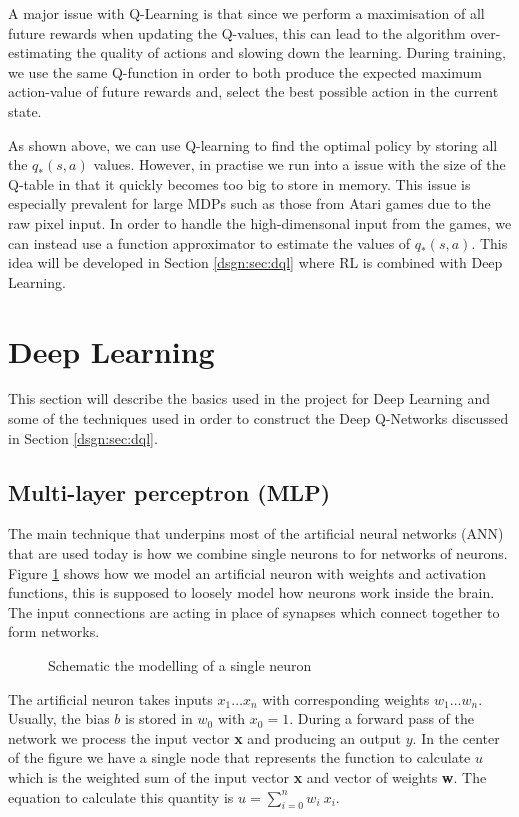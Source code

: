A major issue with Q-Learning is that since we perform a maximisation of all future rewards when updating the Q-values, this can lead to the algorithm over-estimating the quality of actions and slowing down the learning. During training, we use the same Q-function in order to both produce the expected maximum action-value of future rewards and, select the best possible action in the current state.



As shown above, we can use Q-learning to find the optimal policy by storing all the $q_*(s, a)$ values. However, in practise we run into a issue with the size of the Q-table in that it quickly becomes too big to store in memory. This issue is especially prevalent for large MDPs such as those from Atari games due to the raw pixel input. In order to handle the high-dimensonal input from the games, we can instead use a function approximator to estimate the values of $q_*(s, a)$. This idea will be developed in Section \ref{dsgn:sec:dql} where RL is combined with Deep Learning.

\section{Deep Learning}
\label{dsgn:sec:dl}
This section will describe the basics used in the project for Deep Learning and some of the techniques used in order to construct the Deep Q-Networks discussed in Section \ref{dsgn:sec:dql}.

\subsection{Multi-layer perceptron (MLP)}
\label{dsgn:sec:dl:mlp}
The main technique that underpins most of the artificial neural networks (ANN) that are used today is how we combine single neurons to for networks of neurons. Figure \ref{fig:neuron} shows how we model an artificial neuron with weights and activation functions, this is supposed to loosely model how neurons work inside the brain. The input connections are acting in place of synapses which connect together to form networks.

\begin{figure}[ht!]
	\centering
	\caption{Schematic the modelling of a single neuron} \label{fig:neuron}
\end{figure}

The artificial neuron takes inputs $x_1 \hdots x_n$ with corresponding weights $w_1 \hdots w_n$. Usually, the bias $b$ is stored in $w_0$ with $x_0 = 1$. During a forward pass of the network we process the input vector \textbf{x} and producing an output $y$. In the center of the figure we have a single node that represents the function to calculate $u$ which is the weighted sum of the input vector \textbf{x} and vector of weights \textbf{w}. The equation to calculate this quantity is $u = \sum_{i=0}^n w_i~x_i$.

